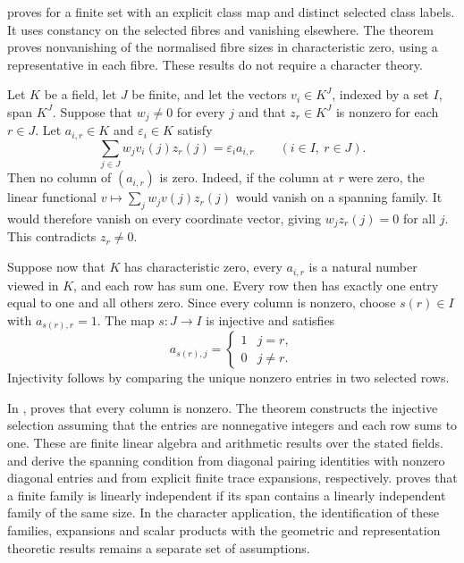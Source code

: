 \begin{implementation}
 proves
 for a finite set with an explicit
class map and distinct selected class labels. It uses constancy on
the selected fibres and vanishing elsewhere. The theorem
 proves nonvanishing of the
normalised fibre sizes in characteristic zero, using a representative
in each fibre. These results do not require a character theory.
\end{implementation}

Let $K$ be a field, let $J$ be finite, and let the vectors
$v_i\in K^J$, indexed by a set $I$, span $K^J$. Suppose that
$w_j\ne0$ for every $j$ and that $z_r\in K^J$ is nonzero for each
$r\in J$. Let $a_{i,r}\in K$ and $\varepsilon_i\in K$ satisfy
\[
 \sum_{j\in J}w_jv_i(j)z_r(j)=\varepsilon_i a_{i,r}
 \qquad(i\in I,\ r\in J).
\]
Then no column of $(a_{i,r})$ is zero. Indeed, if the column at $r$
were zero, the linear functional
$v\mapsto\sum_jw_jv(j)z_r(j)$ would vanish on a spanning family.
It would therefore vanish on every coordinate vector, giving
$w_jz_r(j)=0$ for all $j$. This contradicts $z_r\ne0$.

Suppose now that $K$ has characteristic zero, every $a_{i,r}$ is a
natural number viewed in $K$, and each row has sum one. Every row
then has exactly one entry equal to one and all others zero. Since
every column is nonzero, choose $s(r)\in I$ with $a_{s(r),r}=1$.
The map $s:J\to I$ is injective and satisfies
\[
 a_{s(r),j}=\begin{cases}1&j=r,\\0&j\ne r.\end{cases}
\]
Injectivity follows by comparing the unique nonzero entries in two
selected rows.

\begin{implementation}
In ,
 proves that every
column is nonzero. The theorem
constructs the injective selection assuming that the entries are
nonnegative integers and each row sums to one. These are finite linear algebra and arithmetic
results over the stated fields.
 and
 derive the spanning condition
from diagonal pairing identities with nonzero diagonal entries and from
explicit finite trace expansions, respectively.
 proves that a finite family is linearly independent if its span contains
a linearly independent family of the same size.
In the character application, the identification of these families,
expansions and scalar products with the geometric and representation
theoretic results remains a separate set of assumptions.
\end{implementation}


